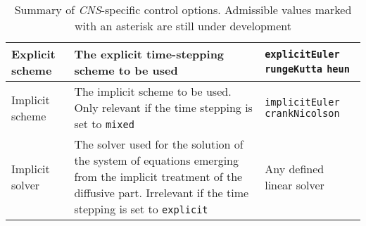 \begin{table}
\begin{tabular}{l | p{8cm} | p{3cm}}
		\hline
		Explicit scheme
		& The explicit time-stepping scheme to be used
		& \texttt{explicitEuler} \hspace{3cm} \texttt{rungeKutta} \hspace{3cm}
		\texttt{heun}\\
		
		\hline
		Implicit scheme
		& The implicit scheme to be used. Only relevant if the time stepping is set
		to \texttt{mixed}
		& \texttt{implicitEuler} \hspace{3cm} \texttt{crankNicolson}\\
		
		\hline
		Implicit solver
		& The solver used for the solution of the system of equations emerging
		from the implicit treatment of the diffusive part. Irrelevant if the
		time stepping is set to \texttt{explicit}
		& Any defined linear solver\\
		
		\hline
	\end{tabular}
	
	\caption{Summary of \emph{CNS}-specific control options. Admissible values marked
	with an asterisk are still under development}
	\label{fig:properties}
\end{table}
